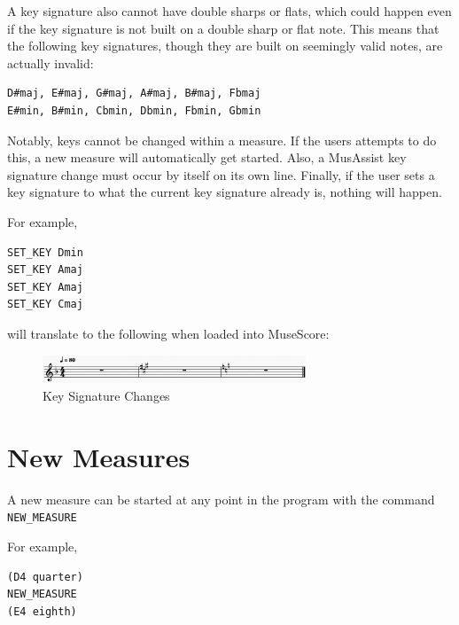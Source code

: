 \documentclass{report}
\begin{document}
A key signature also cannot have double sharps or flats, which could happen even if the key signature is not built on a double sharp or flat note. This means that the following key signatures, though they are built on seemingly valid notes, are actually invalid:
\begin{verbatim}
D#maj, E#maj, G#maj, A#maj, B#maj, Fbmaj
E#min, B#min, Cbmin, Dbmin, Fbmin, Gbmin
\end{verbatim}


Notably, keys cannot be changed within a measure. If the users attempts to do this, a new measure will automatically get started. Also, a MusAssist key signature change must occur by itself on its own line. Finally, if the user sets a key signature to what the current key signature already is, nothing will happen. 

For example,
\begin{verbatim}
SET_KEY Dmin
SET_KEY Amaj
SET_KEY Amaj
SET_KEY Cmaj
\end{verbatim}

will translate to the following when loaded into MuseScore:

\begin{figure}[h!]
\centering
\includegraphics[width=0.7\textwidth]{images/keys}
  \caption{Key Signature Changes}
\end{figure}
\newpage

\section{New Measures}
A new measure can be started at any point in the program with the command \verb.NEW_MEASURE.

For example,
\begin{verbatim}
(D4 quarter)
NEW_MEASURE
(E4 eighth)
\end{verbatim}
\end{document}
